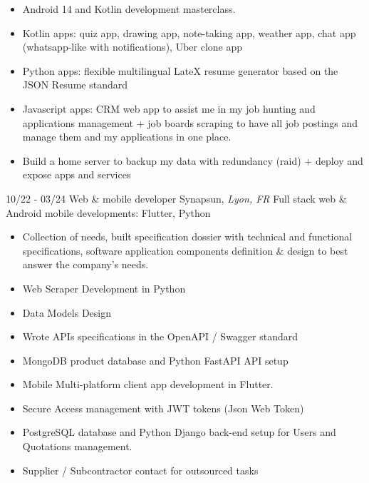 \documentclass[]{friggeri-cv}
\begin{document}
\vspace{0.5mm}
\begin{itemize}
\setlength{\itemsep}{1pt}
\setlength{\parskip}{0pt}
\setlength{\parsep}{0pt}

\item Android 14 and Kotlin development masterclass.
\item Kotlin apps: quiz app, drawing app, note-taking app, weather app, chat app (whatsapp-like with notifications), Uber clone app
\item Python apps: flexible multilingual LateX resume generator based on the JSON Resume standard
\item Javascript apps: CRM web app to assist me in my job hunting and applications management + job boards scraping to have all job postings and manage them and my applications in one place.
\item Build a home server to backup my data with redundancy (raid) + deploy and expose apps and services
\end{itemize}

\begin{entrylist}
  \entry
    {10/22 - 03/24}
    {Web \& mobile developer}
    {Synapsun, \textit{Lyon, FR}}
    {Full stack web \& Android mobile developments: \hspace*{8mm}Flutter, Python}
\end{entrylist}
\vspace{-15pt}

\vspace{0.5mm}
\begin{itemize}
\setlength{\itemsep}{1pt}
\setlength{\parskip}{0pt}
\setlength{\parsep}{0pt}

\item Collection of needs, built specification dossier with technical and functional specifications, software application components definition \& design to best answer the company's needs.
\item Web Scraper Development in Python
\item Data Models Design
\item Wrote APIs specifications in the OpenAPI / Swagger standard
\item MongoDB product database and Python FastAPI API setup
\item Mobile Multi-platform client app development in Flutter.
\item Secure Access management with JWT tokens (Json Web Token)
\item PostgreSQL database and Python Django back-end setup for Users and Quotations management.
\item Supplier / Subcontractor contact for outsourced tasks
\end{itemize}
\end{document}
